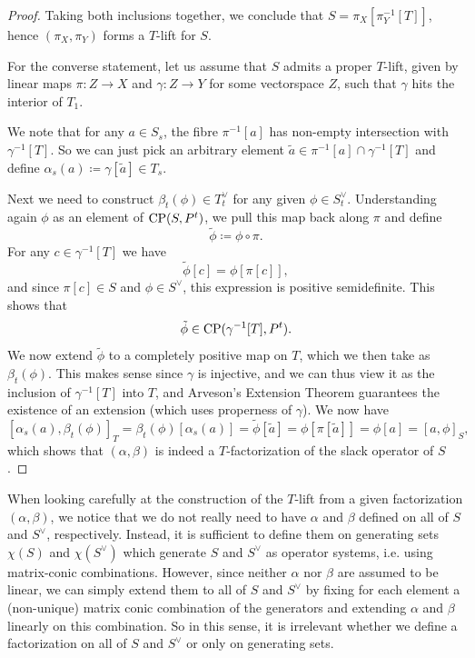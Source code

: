 \documentclass[11pt,onecolumn]{article}
\theoremstyle{plain}
\theoremstyle{definition}
\begin{document}
\begin{proof}
	Taking both inclusions together, we conclude that \(S = \pi_X[\pi_Y^{-1}[T]]\), hence \((\pi_X, \pi_Y)\) forms a \(T\)-lift for \(S\).
	
	For the converse statement, let us assume that \(S\) admits a proper \(T\)-lift, given by  linear maps \(\pi\colon Z \to X\) and \(\gamma\colon Z \to Y\) for some vectorspace \(Z\), such that $\gamma$ hits the interior of $T_1$. 
	
	We note that for any \(a \in S_s\), the fibre \(\pi^{-1}[a]\) has non-empty intersection with \(\gamma^{-1}[T]\). So we can just pick an arbitrary  element \(\tilde{a} \in \pi^{-1}[a] \cap \gamma^{-1}[T]\) and define \(\alpha_s(a) \coloneqq \gamma[\tilde{a}]\in T_s.\)
	
	Next we need to construct \(\beta_t(\phi)\in T^\vee_t\) for any given \(\phi \in S^\lor_t\). Understanding again \(\phi\) as an element of \({\rm CP}(S, P^t)\), we pull this map back along \(\pi\) and define \[\tilde{\phi} \coloneqq \phi \circ \pi.\] For any \(c \in \gamma^{-1}[T]\) we have \[\tilde{\phi}[c] = \phi[\pi[c]],\] and since \(\pi[c] \in S\) and \(\phi \in S^\lor\), this expression is positive semidefinite. This shows that \[\tilde{\phi} \in {\rm CP}(\gamma^{-1}[T], P^t).\]
	We now  extend \(\tilde{\phi}\) to a completely positive map on \(T\), which we then take as \(\beta_t(\phi)\). This  makes sense since \(\gamma\) is injective, and we can thus view it as the inclusion of \(\gamma^{-1}[T]\) into \(T\), and  Arveson's Extension Theorem guarantees the existence of an extension (which uses properness of $\gamma$).   We now have  \[[\alpha_s(a),\beta_t(\phi)]_T=\beta_t(\phi)[\alpha_s(a)] = \tilde{\phi}[\tilde{a}] = \phi[\pi[\tilde{a}]] = \phi[a]=[a,\phi]_S,\] which shows that \((\alpha, \beta)\) is indeed a \(T\)-factorization of the slack operator of \(S\). 
\end{proof}

When looking carefully at the construction of the \(T\)-lift from a given factorization \((\alpha,\beta)\), we notice that we do not really need to have \(\alpha\) and \(\beta\) defined on all of \(S\) and \(S^\lor\), respectively. Instead, it is sufficient to define them on generating sets \(\chi(S)\) and \(\chi(S^\lor)\) which generate \(S\) and \(S^\lor\) as operator systems, i.e. using matrix-conic combinations. However, since neither \(\alpha\) nor \(\beta\) are assumed to be linear, we can simply extend them to all of \(S\) and \(S^\lor\) by fixing for each element a (non-unique) matrix conic combination of the generators and extending \(\alpha\) and \(\beta\) linearly on this combination. So in this sense, it is irrelevant whether we define a factorization on all of \(S\) and \(S^\lor\) or only on generating sets.
\end{document}
